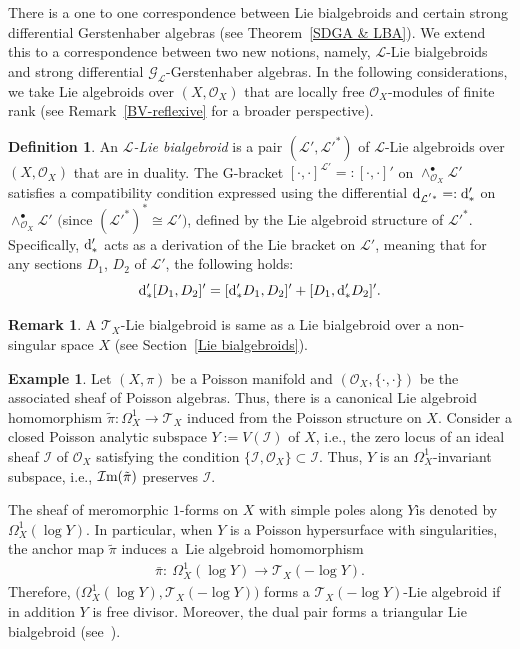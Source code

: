 \documentclass[pdftex]{sigma}
\numberwithin{equation}{section}
\theoremstyle{definition}
\newtheorem{Def}[Thm]{Definition}
\newtheorem{Exm}[Thm]{Example}
\newtheorem{Rem}[Thm]{Remark}
\begin{document}
There is a one to one correspondence between Lie bialgebroids and certain strong differential Gerstenhaber algebras (see Theorem~\ref{SDGA & LBA}). We extend this to a correspondence between two new notions, namely, $\mathcal{L}$-Lie bialgebroids and strong differential $\mathcal{G}_{\mathcal{L}}$-Gerstenhaber algebras.
In the following considerations, we take Lie algebroids over $(X,\mathcal{O}_X)$ that are locally free $\mathcal{O}_X$-modules of finite rank (see Remark~\ref{BV-reflexive} for a broader perspective).
\begin{Def}
	An \emph{$\mathcal{L}$-Lie bialgebroid} is a pair $(\mathcal{L}', \mathcal{L}'^*)$ of $\mathcal{L}$-Lie algebroids over $(X, \mathcal{O}_X)$ that are in duality. The G-bracket $[\cdot, \cdot]^{\mathcal{L}'}=:[\cdot, \cdot]'$ on $\wedge^\bullet_{\mathcal{O}_X} \mathcal{L}'$ satisfies a compatibility condition expressed using the differential ${\rm d}_{\mathcal{L}^{'*}} =:{\rm d}'_*$ on $ \wedge^\bullet_{\mathcal{O}_X} \mathcal{L}' $ $($since $(\mathcal{L'}^{*})^* \cong \mathcal{L'})$, defined by the Lie algebroid structure of $\mathcal{L}'^*$. Specifically, ${\rm d}'_* $ acts as a derivation of the Lie bracket on $\mathcal{L}'$, meaning that for any sections $D_1$, $D_2$ of $\mathcal{L}'$, the following holds:
\[
{\rm d}'_*[D_1,D_2]'=[{\rm d}'_*D_1, D_2]'+[D_1, {\rm d}'_* D_2]'.
\]
\end{Def}
\begin{Rem}A $\mathcal{T}_X$-Lie bialgebroid is same as a Lie bialgebroid over a non-singular space $X$ (see Section~\ref{Lie bialgebroids}).
\end{Rem}
\begin{Exm} \label{log Poisson}
	Let $(X, \pi)$ be a Poisson manifold and $(\mathcal{O}_X, \{\cdot, \cdot \})$ be the associated sheaf of Poisson algebras. Thus, there is a canonical Lie algebroid homomorphism
	$\tilde{\pi}\colon \Omega^1_X \rightarrow \mathcal{T}_X$ induced from the Poisson structure on $X$.
	Consider a closed Poisson analytic subspace $Y:= V(\mathcal{I})$ of $X$, i.e., the zero locus of an ideal sheaf $\mathcal{I}$ of $\mathcal{O}_X$ satisfying the condition $\{\mathcal{I}, \mathcal{O}_X\} \subset \mathcal{I}$.
	Thus, $Y$ is an $\Omega^1_X$-invariant subspace, i.e., $\mathcal{I}{\rm m}(\tilde{\pi})$ preserves $\mathcal{I}$.
	
The sheaf of meromorphic $1$-forms on $X$ with simple poles along $Y$is denoted by $\Omega^1_X(\log Y)$. In particular, when $Y$ is a Poisson hypersurface with singularities, the anchor map $\tilde{\pi}$ induces a~Lie algebroid homomorphism
	\begin{align*}%
		\bar{\pi}\colon \ \Omega^1_X(\log Y) \rightarrow \mathcal{T}_X(-\log Y).
	\end{align*}
	Therefore, $\bigl(\Omega^1_X(\log Y), \mathcal{T}_X(-\log Y)\bigr)$ forms a $\mathcal{T}_X(-\log Y)$-Lie algebroid if in addition $Y$ is free divisor. Moreover, the dual pair forms a triangular Lie bialgebroid (see~\cite{BP}).
\end{Exm}
\end{document}
